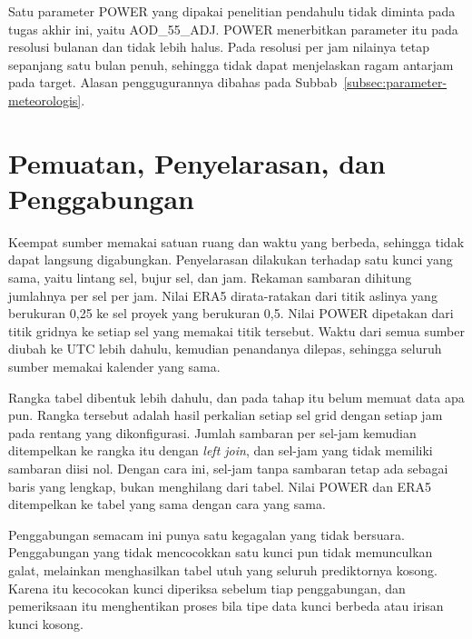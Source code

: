 Satu parameter POWER yang dipakai penelitian pendahulu tidak diminta pada tugas akhir ini, yaitu AOD\_55\_ADJ.
POWER menerbitkan parameter itu pada resolusi bulanan dan tidak lebih halus.
Pada resolusi per jam nilainya tetap sepanjang satu bulan penuh, sehingga tidak dapat menjelaskan ragam antarjam pada target.
Alasan penggugurannya dibahas pada Subbab~\ref{subsec:parameter-meteorologis}.

\section{Pemuatan, Penyelarasan, dan Penggabungan}
\label{sec:penggabungan}
Keempat sumber memakai satuan ruang dan waktu yang berbeda, sehingga tidak dapat langsung digabungkan.
Penyelarasan dilakukan terhadap satu kunci yang sama, yaitu lintang sel, bujur sel, dan jam.
Rekaman sambaran dihitung jumlahnya per sel per jam.
Nilai ERA5 dirata-ratakan dari titik aslinya yang berukuran 0,25\textdegree{} ke sel proyek yang berukuran 0,5\textdegree.
Nilai POWER dipetakan dari titik gridnya ke setiap sel yang memakai titik tersebut.
Waktu dari semua sumber diubah ke UTC lebih dahulu, kemudian penandanya dilepas, sehingga seluruh sumber memakai kalender yang sama.

Rangka tabel dibentuk lebih dahulu, dan pada tahap itu belum memuat data apa pun.
Rangka tersebut adalah hasil perkalian setiap sel grid dengan setiap jam pada rentang yang dikonfigurasi.
Jumlah sambaran per sel-jam kemudian ditempelkan ke rangka itu dengan \textit{left join}, dan sel-jam yang tidak memiliki sambaran diisi nol.
Dengan cara ini, sel-jam tanpa sambaran tetap ada sebagai baris yang lengkap, bukan menghilang dari tabel.
Nilai POWER dan ERA5 ditempelkan ke tabel yang sama dengan cara yang sama.

Penggabungan semacam ini punya satu kegagalan yang tidak bersuara.
Penggabungan yang tidak mencocokkan satu kunci pun tidak memunculkan galat, melainkan menghasilkan tabel utuh yang seluruh prediktornya kosong.
Karena itu kecocokan kunci diperiksa sebelum tiap penggabungan, dan pemeriksaan itu menghentikan proses bila tipe data kunci berbeda atau irisan kunci kosong.